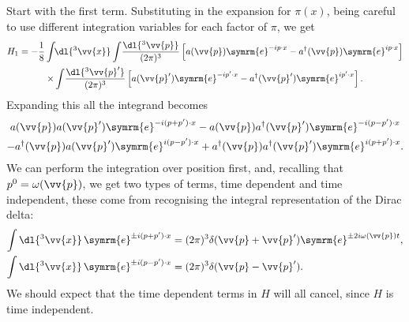 \documentclass[fleqn]{NotesClass}
\newcommand{\e}{\symrm{e}}
\newcommand{\hermit}{{\dagger}}
\begin{document}
    Start with the first term.
    Substituting in the expansion for \(\pi(x)\), being careful to use different integration variables for each factor of \(\pi\), we get
    \begin{multline}
        H_1 = -\frac{1}{8} \int \!\! \dl{^3\vv{x}} \int \! \frac{\dl{^3\vv{p}}}{(2\pi)^3} \left[ a(\vv{p}) \e^{-ip\cdot x} - a^\hermit(\vv{p}) \e^{ip\cdot x} \right] \\
        \times\int \! \frac{\dl{^3\vv{p}'}}{(2\pi)^3} \left[ a(\vv{p}') \e^{-ip'\cdot x} - a^\hermit(\vv{p}') \e^{ip'\cdot x} \right].
    \end{multline}
    Expanding this all the integrand becomes
    \begin{multline}
        a(\vv{p}) a(\vv{p}') \e^{-i(p + p')\cdot x} - a(\vv{p}) a^\hermit(\vv{p}') \e^{-i(p - p')\cdot x}\\
        - a^\hermit(\vv{p})a(\vv{p}')\e^{i(p - p') \cdot x} + a^\hermit(\vv{p}) a^\hermit(\vv{p}') \e^{i(p + p')\cdot x}.
    \end{multline}
    We can perform the integration over position first, and, recalling that \(p^0 = \omega(\vv{p})\), we get two types of terms, time dependent and time independent, these come from recognising the integral representation of the Dirac delta:
    \begin{align}
        \int \dl{^3\vv{x}} \, \e^{\pm i(p + p') \cdot x} &= (2\pi)^3 \delta(\vv{p} + \vv{p}') \e^{\pm 2i\omega(\vv{p})t},\\
        \int \dl{^3\vv{x}} \, \e^{\pm i(p - p') \cdot x} &= (2\pi)^3 \delta(\vv{p} - \vv{p}').
    \end{align}
    We should expect that the time dependent terms in \(H\) will all cancel, since \(H\) is time independent.
    
\end{document}
